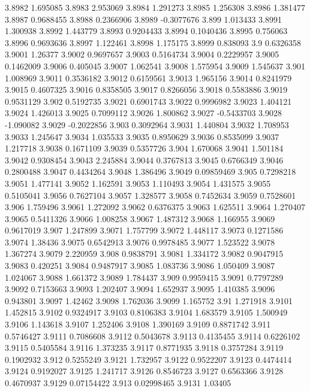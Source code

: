 3.8982  1.695085
3.8983  2.953069
3.8984  1.291273
3.8985  1.256308
3.8986  1.381477
3.8987  0.9688455
3.8988  0.2366906
3.8989  -0.3077676
3.899  1.013433
3.8991  1.300938
3.8992  1.443779
3.8993  0.9204433
3.8994  0.1040436
3.8995  0.756063
3.8996  0.9693636
3.8997  1.122461
3.8998  1.175175
3.8999  0.838093
3.9  0.6326358
3.9001  1.26377
3.9002  0.9697657
3.9003  0.5164734
3.9004  0.2229957
3.9005  0.1462009
3.9006  0.405045
3.9007  1.062541
3.9008  1.575954
3.9009  1.545637
3.901  1.008969
3.9011  0.3536182
3.9012  0.6159561
3.9013  1.965156
3.9014  0.8241979
3.9015  0.4607325
3.9016  0.8358505
3.9017  0.8266056
3.9018  0.5583886
3.9019  0.9531129
3.902  0.5192735
3.9021  0.6901743
3.9022  0.9996982
3.9023  1.404121
3.9024  1.426013
3.9025  0.7099112
3.9026  1.800862
3.9027  -0.5433703
3.9028  -1.090082
3.9029  -0.2022856
3.903  0.3092964
3.9031  1.440804
3.9032  1.708953
3.9033  1.245647
3.9034  1.035533
3.9035  0.8950629
3.9036  0.8535099
3.9037  1.217718
3.9038  0.1671109
3.9039  0.5357726
3.904  1.670068
3.9041  1.501184
3.9042  0.9308454
3.9043  2.245884
3.9044  0.3767813
3.9045  0.6766349
3.9046  0.2800488
3.9047  0.4434264
3.9048  1.386496
3.9049  0.09859469
3.905  0.7298218
3.9051  1.477141
3.9052  1.162591
3.9053  1.110493
3.9054  1.431575
3.9055  0.5105041
3.9056  0.7627104
3.9057  1.328577
3.9058  0.7452634
3.9059  0.7528601
3.906  1.759496
3.9061  1.272092
3.9062  0.6376375
3.9063  1.625511
3.9064  1.270407
3.9065  0.5411326
3.9066  1.008258
3.9067  1.487312
3.9068  1.166955
3.9069  0.9617019
3.907  1.247899
3.9071  1.757799
3.9072  1.448117
3.9073  0.1271586
3.9074  1.38436
3.9075  0.6542913
3.9076  0.9978485
3.9077  1.523522
3.9078  1.367274
3.9079  2.220959
3.908  0.9838791
3.9081  1.334172
3.9082  0.9047915
3.9083  0.420251
3.9084  0.9487917
3.9085  1.083736
3.9086  1.050409
3.9087  1.024067
3.9088  1.661372
3.9089  1.784437
3.909  0.9959415
3.9091  0.7797289
3.9092  0.7153663
3.9093  1.202407
3.9094  1.652937
3.9095  1.410385
3.9096  0.943801
3.9097  1.42462
3.9098  1.762036
3.9099  1.165752
3.91  1.271918
3.9101  1.452815
3.9102  0.9324917
3.9103  0.8106383
3.9104  1.683579
3.9105  1.500949
3.9106  1.143618
3.9107  1.252406
3.9108  1.390169
3.9109  0.8871742
3.911  0.5746427
3.9111  0.7086608
3.9112  0.5043678
3.9113  0.4135455
3.9114  0.6226102
3.9115  0.5405584
3.9116  1.373235
3.9117  0.8771935
3.9118  0.3757284
3.9119  0.1902932
3.912  0.5255249
3.9121  1.732957
3.9122  0.9522207
3.9123  0.4474414
3.9124  0.9192027
3.9125  1.241717
3.9126  0.8546723
3.9127  0.6563366
3.9128  0.4670937
3.9129  0.07154422
3.913  0.02998465
3.9131  1.03405
